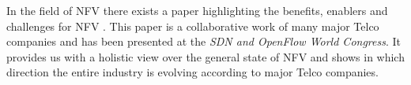 In the field of \acs{NFV} there exists a paper highlighting the benefits, enablers and challenges for \acs{NFV} \cite{att2012NFV}. This paper is a collaborative work of many major \acs{Telco} companies and has been presented at the \textit{\acs{SDN} and OpenFlow World Congress}. It provides us with a holistic view over the general state of \acs{NFV} and shows in which direction the entire industry is evolving according to major \acs{Telco} companies.



